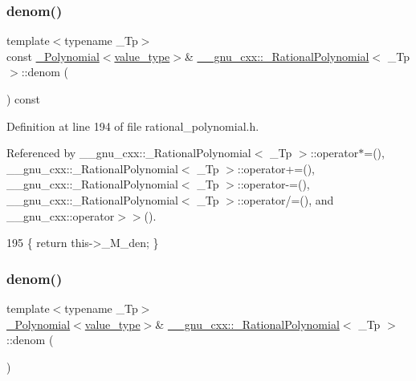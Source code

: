 \subsubsection{\texorpdfstring{denom()}{denom()}\hspace{0.1cm}{\footnotesize\ttfamily [1/2]}}
{\footnotesize\ttfamily template$<$typename \+\_\+\+Tp$>$ \\
const \hyperlink{class____gnu__cxx_1_1__Polynomial}{\+\_\+\+Polynomial}$<$\hyperlink{class____gnu__cxx_1_1__RationalPolynomial_adeec7f1bec03111031599f337848ee8b}{value\+\_\+type}$>$\& \hyperlink{class____gnu__cxx_1_1__RationalPolynomial}{\+\_\+\+\_\+gnu\+\_\+cxx\+::\+\_\+\+Rational\+Polynomial}$<$ \+\_\+\+Tp $>$\+::denom (\begin{DoxyParamCaption}{ }\end{DoxyParamCaption}) const\hspace{0.3cm}{\ttfamily [inline]}}



Definition at line 194 of file rational\+\_\+polynomial.\+h.



Referenced by \+\_\+\+\_\+gnu\+\_\+cxx\+::\+\_\+\+Rational\+Polynomial$<$ \+\_\+\+Tp $>$\+::operator$\ast$=(), \+\_\+\+\_\+gnu\+\_\+cxx\+::\+\_\+\+Rational\+Polynomial$<$ \+\_\+\+Tp $>$\+::operator+=(), \+\_\+\+\_\+gnu\+\_\+cxx\+::\+\_\+\+Rational\+Polynomial$<$ \+\_\+\+Tp $>$\+::operator-\/=(), \+\_\+\+\_\+gnu\+\_\+cxx\+::\+\_\+\+Rational\+Polynomial$<$ \+\_\+\+Tp $>$\+::operator/=(), and \+\_\+\+\_\+gnu\+\_\+cxx\+::operator$>$$>$().


\begin{DoxyCode}
195       \{ \textcolor{keywordflow}{return} this->\_M\_den; \}
\end{DoxyCode}
\mbox{\label{class____gnu__cxx_1_1__RationalPolynomial_a81fdcf1099981053c3d08ebcf8e2d278}} 
\subsubsection{\texorpdfstring{denom()}{denom()}\hspace{0.1cm}{\footnotesize\ttfamily [2/2]}}
{\footnotesize\ttfamily template$<$typename \+\_\+\+Tp$>$ \\
\hyperlink{class____gnu__cxx_1_1__Polynomial}{\+\_\+\+Polynomial}$<$\hyperlink{class____gnu__cxx_1_1__RationalPolynomial_adeec7f1bec03111031599f337848ee8b}{value\+\_\+type}$>$\& \hyperlink{class____gnu__cxx_1_1__RationalPolynomial}{\+\_\+\+\_\+gnu\+\_\+cxx\+::\+\_\+\+Rational\+Polynomial}$<$ \+\_\+\+Tp $>$\+::denom (\begin{DoxyParamCaption}{ }\end{DoxyParamCaption})\hspace{0.3cm}{\ttfamily [inline]}}



